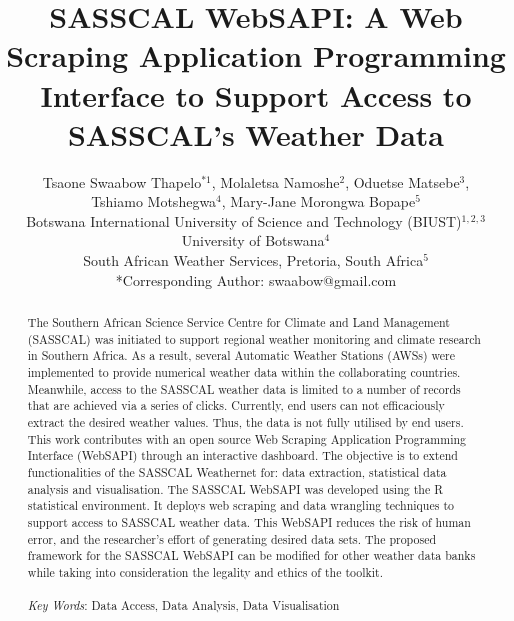 \documentclass[a4paper, 10pt, conference]{ieeeconf}      %
\title{ \bf SASSCAL WebSAPI: A Web Scraping Application Programming Interface to Support Access to    SASSCAL's Weather Data
}
\author{Tsaone Swaabow Thapelo$^{*1}$,  Molaletsa Namoshe$^{2}$,  Oduetse Matsebe$^3$,\\
Tshiamo Motshegwa$^4$, Mary-Jane Morongwa Bopape$^5$  \\
	Botswana International University of Science and Technology (BIUST)$^{1,2,3}$\\
		University of Botswana$^4$\\
			South African Weather Services, Pretoria, South Africa$^{5}$ \\
		{*\color{black}Corresponding Author}: {\color{black}swaabow@gmail.com}
}
\begin{document}
\maketitle
\thispagestyle{empty}
\pagestyle{empty}


\begin{abstract}
\noindent
The Southern African Science Service Centre for Climate and Land Management (SASSCAL)  was initiated to support regional weather monitoring and climate research  in Southern Africa.
As a result, several Automatic Weather Stations (AWSs) were implemented to provide numerical weather data within the collaborating countries. 
 Meanwhile, access to the SASSCAL weather data is limited to a number of records that are achieved via a series of clicks. 
 Currently, end users can  not efficaciously extract the desired weather values. 
Thus, the data is not fully utilised by end users. %
 This work  contributes with an open source Web Scraping Application Programming Interface (WebSAPI) through an interactive dashboard. 
 The objective is to extend functionalities of the SASSCAL Weathernet for: data extraction, statistical data analysis and visualisation. %
  The SASSCAL WebSAPI    was developed using the R statistical environment. 
  It deploys  web scraping and data wrangling techniques to support access to SASSCAL weather data. %
 This WebSAPI reduces the risk of human error, and the researcher's effort of generating desired data sets.  %
  The proposed framework for the SASSCAL WebSAPI can  be modified for other weather data banks   while taking into consideration the legality and ethics of the toolkit.  %
\\
\\
\emph{Key Words}:   Data Access, Data Analysis, Data Visualisation
\end{abstract}

\end{document}
